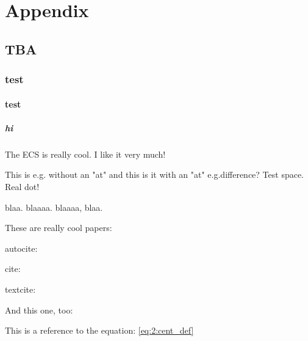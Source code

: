 


\chapter{Appendix}

\renewcommand{\thesection}{\Alph{section}}


\section{TBA}

\subsection{test}

\subsubsection{test}

\paragraph{hi}

The \ac{ECS} is really cool. I like it very much!

This is e.g. without an "at" and this is it with an "at" e.g.\@ difference?
Test space. Real dot!

\Eg blaa. \Eg{} blaaaa. \ie blaaaa, \ie{} blaa.

These are really cool papers: \autocite{Schlund2020, Schlund2020a}

autocite:
\autocite{Lauer2018}

cite:
\cite{Lauer2010}
\autocite{Anav2015}
\autocite{Anav2013}
\autocite{Allen2002}

textcite:
\textcite{Lauer2010}

And this one, too: \autocite{Lauer2020}

This is a reference to the equation: \cref{eq:2:cent_def}

